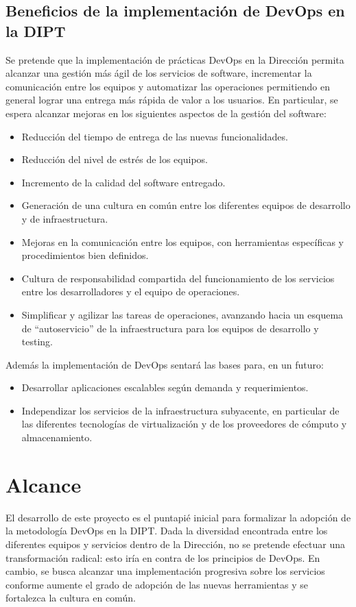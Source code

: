 \subsection{Beneficios de la implementación de DevOps en la DIPT}

Se pretende que la implementación de prácticas DevOps en la Dirección
permita alcanzar una gestión más ágil de los servicios de software,
incrementar la comunicación entre los equipos y automatizar las
operaciones permitiendo en general lograr una entrega más rápida de
valor a los usuarios. En particular, se espera alcanzar mejoras en los
siguientes aspectos de la gestión del software:

\begin{itemize}
\item Reducción del tiempo de entrega de las nuevas funcionalidades.
\item Reducción del nivel de estrés de los equipos.
\item Incremento de la calidad del software entregado.
\item Generación de una cultura en común entre los diferentes equipos
  de desarrollo y de infraestructura.
\item Mejoras en la comunicación entre los equipos, con herramientas
  específicas y procedimientos bien definidos.
\item Cultura de responsabilidad compartida del funcionamiento de los
  servicios entre los desarrolladores y el equipo de operaciones.
\item Simplificar y agilizar las tareas de operaciones, avanzando
  hacia un esquema de ``autoservicio'' de la infraestructura para los
  equipos de desarrollo y testing.
\end{itemize}
Además la implementación de DevOps sentará las bases para, en un
futuro:

\begin{itemize}
\item Desarrollar aplicaciones escalables según demanda y
  requerimientos.
\item Independizar los servicios de la infraestructura subyacente, en
  particular de las diferentes tecnologías de virtualización y de los
  proveedores de cómputo y almacenamiento.
\end{itemize}
\section{Alcance}

El desarrollo de este proyecto es el puntapié inicial para formalizar
la adopción de la metodología DevOps en la DIPT. Dada la diversidad
encontrada entre los diferentes equipos y servicios dentro de la
Dirección, no se pretende efectuar una transformación radical: esto
iría en contra de los principios de DevOps. En cambio, se busca
alcanzar una implementación progresiva sobre los servicios conforme
aumente el grado de adopción de las nuevas herramientas y se
fortalezca la cultura en común.


